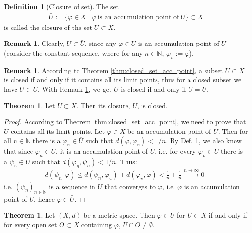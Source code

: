 \documentclass[12pt, a4paper]{article}
\numberwithin{equation}{section}
\theoremstyle{definition}
\theoremstyle{definition}
\newtheorem{defn}[thm]{Definition} %
\newtheorem{remark}[thm]{Remark} %
\newtheorem{theorem}[thm]{Theorem}
\begin{document}
	\begin{defn}[Closure of set]\label{defn:closure_set}
		The set 
		\begin{align}
			\bar{U} := \{\varphi\in X\mid \varphi\ \text{is an accumulation point of}\ U\} \subset X
		\end{align}
		is called the closure of the set $U \subset X$.
	\end{defn}

	\begin{remark}\label{remark:closure_superset}
		Clearly, $U\subset \bar{U}$, since any $\varphi\in U$ is an accumulation point of $U$ (consider the constant sequence, where for any $n\in\mathbb N$, $\varphi_n := \varphi$).
	\end{remark}

	\begin{remark}
		According to Theorem \ref{thm:closed_set_acc_point}, a subset $U\subset X$ is closed if and only if it contains all its limit points, thus for a closed subset we have $\overline{U} \subset U$. With Remark \ref{remark:closure_superset}, we get $U$ is closed if and only if $U = \overline{U}$.
	\end{remark}
	
	\begin{theorem}\label{thrm:closure_closed}
		Let $U\subset X$. Then its closure, $\bar{U}$, is closed.
	\end{theorem}

	\begin{proof}
		According to Theorem \ref{thm:closed_set_acc_point}, we need to prove that $\bar{U}$ contains all its limit points. Let $\varphi\in X$ be an accumulation point of $\overline{U}$. Then for all $n\in \mathbb N$ there is a $\varphi_n\in\overline{U}$ such that $d(\varphi, \varphi_n) < 1/n$. By Def. \ref{defn:closure_set}, we also know that since $\varphi_n\in \bar{U}$, it is an accumulation point of $U$, i.e. for every $\varphi_n\in \overline{U}$ there is a $\psi_n\in U$ such that $d(\varphi_n, \psi_n) < 1/n$. Thus:
		\begin{align}
			d(\psi_n, \varphi) \leq d(\psi_n, \varphi_n) + d(\varphi_n, \varphi) < \frac{1}{n} + \frac{1}{n} \overset{n\to\infty}{\longrightarrow} 0,
		\end{align}
		i.e. $(\psi_n)_{n\in\mathbb N}$ is a sequence in $U$ that converges to $\varphi$, i.e. $\varphi$ is an accumulation point of $U$, hence $\varphi\in \bar{U}$.
	\end{proof}
	
	\begin{theorem}\label{thrm:property_metric_space}
		Let $(X, d)$ be a metric space. Then $\varphi\in \overline{U}$ for $U\subset X$ if and only if for every open set $O\subset X$ containing $\varphi$, $U\cap O\ne \emptyset$.
	\end{theorem}
\end{document}
